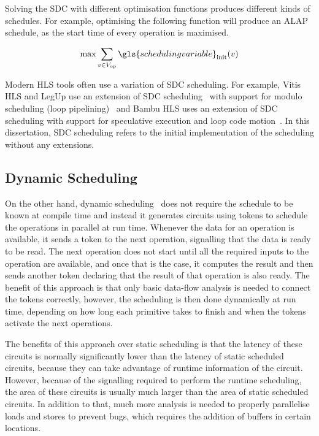 Solving the \gls{SDC} with different optimisation functions produces different
kinds of schedules.  For example, optimising the following function will produce
an \gls{ALAP} schedule, as the start time of every operation is maximised.

\begin{equation*}
  \mathrm{max} \sum_{v \in V_{\mathrm{op}}} \gls{scheduling variable}_{\mathrm{init}}(v)
\end{equation*}

Modern \gls{HLS} tools often use a variation of \gls{SDC} scheduling.  For
example, Vitis HLS and LegUp use an extension of \gls{SDC}
scheduling~\cite[]{zhang13_sdc,canis14_modul_sdc} with support for modulo
scheduling (loop pipelining)~\cite[]{rau96_iterat_modul_sched} and Bambu HLS
uses an extension of \gls{SDC} scheduling with support for speculative execution
and loop code motion~\cite[]{lattuada15_ctbsss}.  In this dissertation,
\gls{SDC} scheduling refers to the initial implementation of the scheduling
without any extensions.

\subsection{Dynamic Scheduling}%
\label{sec:bg:dynamic-scheduling}

On the other hand, \gls{dynamic
  scheduling}~\cite{josipović18_dynam_sched_high_synth} does not require
the schedule to be known at compile time and instead it generates circuits using
tokens to schedule the operations in parallel at run time.  Whenever the data
for an operation is available, it sends a token to the next operation,
signalling that the data is ready to be read.  The next operation does not start
until all the required inputs to the operation are available, and once that is
the case, it computes the result and then sends another token declaring that the
result of that operation is also ready.  The benefit of this approach is that
only basic data-flow analysis is needed to connect the tokens correctly,
however, the scheduling is then done dynamically at run time, depending on how
long each primitive takes to finish and when the tokens activate the next
operations.

The benefits of this approach over static scheduling is that the latency of
these circuits is normally significantly lower than the latency of static
scheduled circuits, because they can take advantage of runtime information of
the circuit.  However, because of the signalling required to perform the runtime
scheduling, the area of these circuits is usually much larger than the area of
static scheduled circuits.  In addition to that, much more analysis is needed to
properly parallelise loads and stores to prevent bugs, which requires the
addition of buffers in certain locations.


